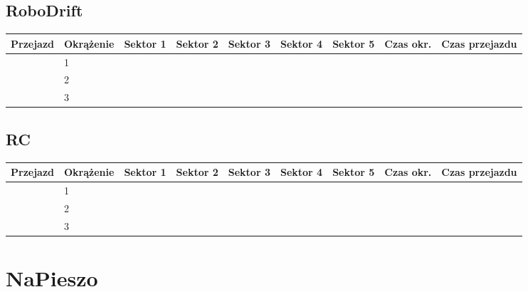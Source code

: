 \documentclass[11pt]{article}
\begin{document}
\subsection{RoboDrift}
\begin{table}[h]
\begin{tabular}{|l|l|l|l|l|l|l|l|l|}
\hline
   Przejazd        & Okrążenie & Sektor 1 & Sektor 2 & Sektor 3 & Sektor 4 & Sektor 5 & Czas okr. & Czas przejazdu    \\ \hline
\multirow{3}{*}{} & 1         &          &          &          &          &          &           & \multirow{3}{*}{} \\ \cline{2-8}
                   & 2         &          &          &          &          &          &           &                  \\ \cline{2-8}
                   & 3         &          &          &          &          &          &           &                   \\ \hline
\end{tabular}
\end{table}
\subsection{RC}
\begin{table}[h]
\begin{tabular}{|l|l|l|l|l|l|l|l|l|}
\hline
   Przejazd        & Okrążenie & Sektor 1 & Sektor 2 & Sektor 3 & Sektor 4 & Sektor 5 & Czas okr. & Czas przejazdu    \\ \hline
\multirow{3}{*}{} & 1         &          &          &          &          &          &           & \multirow{3}{*}{} \\ \cline{2-8}
                   & 2         &          &          &          &          &          &           &                  \\ \cline{2-8}
                   & 3         &          &          &          &          &          &           &                   \\ \hline
\end{tabular}
\end{table}
\pagebreak
\section{NaPieszo}
\end{document}
